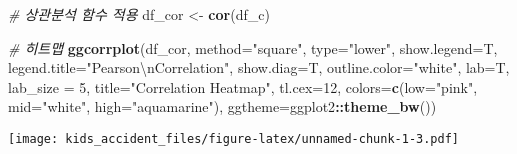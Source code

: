 \documentclass[
]{article}
\newenvironment{Shaded}{\begin{snugshade}}{\end{snugshade}}
\newcommand{\CharTok}[1]{\textcolor[rgb]{0.31,0.60,0.02}{#1}}
\newcommand{\CommentTok}[1]{\textcolor[rgb]{0.56,0.35,0.01}{\textit{#1}}}
\newcommand{\DataTypeTok}[1]{\textcolor[rgb]{0.13,0.29,0.53}{#1}}
\newcommand{\DecValTok}[1]{\textcolor[rgb]{0.00,0.00,0.81}{#1}}
\newcommand{\KeywordTok}[1]{\textcolor[rgb]{0.13,0.29,0.53}{\textbf{#1}}}
\newcommand{\NormalTok}[1]{#1}
\newcommand{\OperatorTok}[1]{\textcolor[rgb]{0.81,0.36,0.00}{\textbf{#1}}}
\newcommand{\StringTok}[1]{\textcolor[rgb]{0.31,0.60,0.02}{#1}}
\begin{document}
\begin{Shaded}
\begin{Highlighting}[]
\CommentTok{# 상관분석 함수 적용}
\NormalTok{df_cor <-}\StringTok{ }\KeywordTok{cor}\NormalTok{(df_c)}

\CommentTok{# 히트맵}
\KeywordTok{ggcorrplot}\NormalTok{(df_cor, }
           \DataTypeTok{method=}\StringTok{"square"}\NormalTok{, }
           \DataTypeTok{type=}\StringTok{"lower"}\NormalTok{, }
           \DataTypeTok{show.legend=}\NormalTok{T,}
           \DataTypeTok{legend.title=}\StringTok{"Pearson}\CharTok{\textbackslash{}n}\StringTok{Correlation"}\NormalTok{,}
           \DataTypeTok{show.diag=}\NormalTok{T,}
           \DataTypeTok{outline.color=}\StringTok{"white"}\NormalTok{,}
           \DataTypeTok{lab=}\NormalTok{T,}
           \DataTypeTok{lab_size =} \DecValTok{5}\NormalTok{,}
           \DataTypeTok{title=}\StringTok{"Correlation Heatmap"}\NormalTok{,}
           \DataTypeTok{tl.cex=}\DecValTok{12}\NormalTok{,}
           \DataTypeTok{colors=}\KeywordTok{c}\NormalTok{(}\DataTypeTok{low=}\StringTok{"pink"}\NormalTok{,}
                    \DataTypeTok{mid=}\StringTok{"white"}\NormalTok{,}
                    \DataTypeTok{high=}\StringTok{"aquamarine"}\NormalTok{),}
           \DataTypeTok{ggtheme=}\NormalTok{ggplot2}\OperatorTok{::}\KeywordTok{theme_bw}\NormalTok{())}
\end{Highlighting}
\end{Shaded}

\texttt{[image: kids\_accident\_files/figure-latex/unnamed-chunk-1-3.pdf]}
\end{document}
